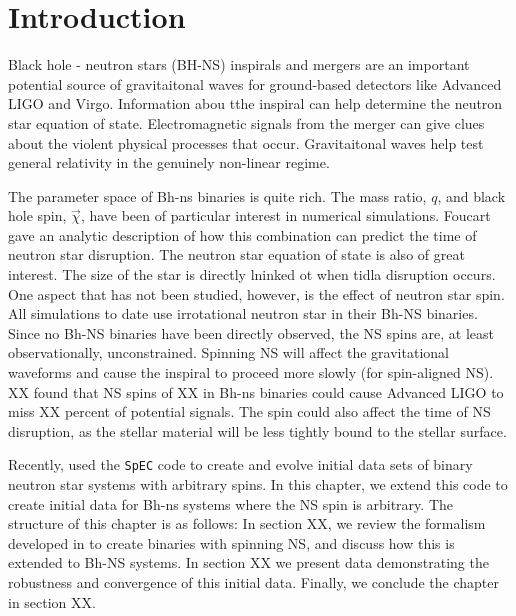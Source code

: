 

\section{Introduction}


Black hole - neutron stars (BH-NS) inspirals and mergers are an important potential source of gravitaitonal waves for ground-based detectors like Advanced LIGO and Virgo. Information abou tthe inspiral can help determine the neutron star equation of state. Electromagnetic signals from the merger can give clues about the violent physical processes that occur. Gravitaitonal waves help test general relativity in the genuinely non-linear regime.

The parameter space of Bh-ns binaries is quite rich. The mass ratio, $q$, and black hole spin, $\vec{\chi}$, have been of particular interest in numerical simulations. Foucart  gave an analytic description of how this combination can predict the time of neutron star disruption. The neutron star equation of state is also of great interest. The size of the star is directly lninked ot when tidla disruption occurs. One aspect that has not been studied, however, is the effect of neutron star spin. All simulations to date use irrotational neutron star in their Bh-NS binaries. Since no Bh-NS binaries have been directly observed, the NS spins are, at least observationally, unconstrained. Spinning NS will affect the gravitational waveforms and cause the inspiral to proceed more slowly (for spin-aligned NS).  XX found that NS spins of XX in Bh-ns binaries could cause Advanced LIGO to miss XX percent of potential signals. The spin could also affect the time of NS disruption, as the stellar material will be less tightly bound to the stellar surface.

Recently, \cite{Tacik:2015tja} used the {\tt SpEC} code to create and
evolve initial data sets of binary neutron star systems with arbitrary
spins. In this chapter, we extend this code to create initial data for
Bh-ns systems where the NS spin is arbitrary. The structure of this
chapter is as follows: In section XX, we review the formalism
developed in \cite{Tichy:2011gw} to create binaries with spinning NS,
and discuss how this is extended to Bh-NS systems. In section XX we
present data demonstrating the robustness and convergence of this
initial data. Finally, we conclude the chapter in section XX.

